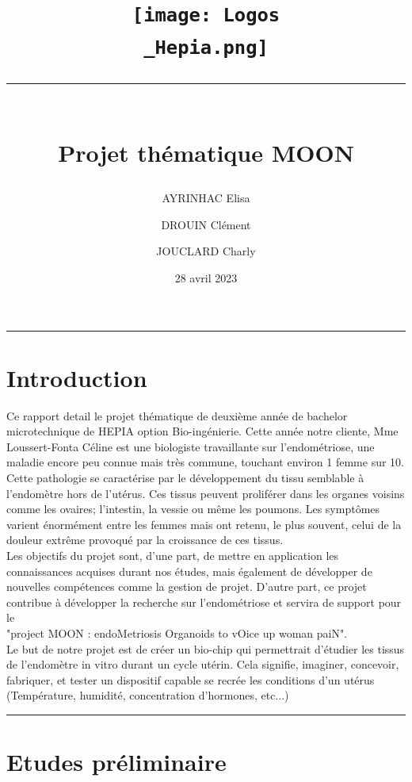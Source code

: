 \documentclass[a4paper, 11pt]{article}
\title{
    \vspace{-2.5cm}
    \centering\texttt{[image: Logos\\\_Hepia.png]}\\
    \centering\rule{17cm}{0.1mm}\vspace*{0.4in}\\
    \centering Projet thématique MOON}
\author[1]{AYRINHAC Elisa}
\author[2]{DROUIN Clément}
\author[3]{JOUCLARD Charly}
\affil[1]{HEPIA, MT2, elisa.ayrinhac@hes-so.ch}
\affil[2]{HEPIA, MT2, clement.drouin@hes-so.ch}
\affil[3]{HEPIA, MT2, charly.jouclard@hes-so.ch}
\date{28 avril 2023}
\begin{document}
\maketitle
\thispagestyle{empty}
\begin{center}
    \rule{\textwidth}{0.1mm}
\end{center}
\vspace{-1cm}
\section*{Introduction}
Ce rapport detail le projet thématique de deuxième année de bachelor
microtechnique de HEPIA option Bio-ingénierie.
Cette année notre cliente, Mme Loussert-Fonta Céline est une biologiste travaillante 
sur l'endométriose, une maladie encore 
peu connue mais très commune, touchant environ 1 femme sur 10.\\
Cette pathologie se caractérise par le développement du tissu semblable 
à l'endomètre hors de l'utérus.
Ces tissus peuvent proliférer dans les organes voisins comme les ovaires; 
l'intestin, la vessie ou même les poumons.
Les symptômes varient énormément entre les femmes mais ont retenu, le 
plus souvent, celui de la douleur 
extrême provoqué par la croissance de ces tissus.\\
Les objectifs du projet sont, d'une part, de mettre en application les 
connaissances acquises durant nos études, mais également de développer de 
nouvelles compétences comme la gestion de projet.
D'autre part, ce projet contribue à développer la recherche sur 
l'endométriose et servira de support pour le \\
"project MOON : endoMetriosis Organoids to vOice up woman paiN".\\
Le but de notre projet est de créer un bio-chip qui permettrait d'étudier 
les tissus de l'endomètre in vitro durant un cycle utérin. Cela signifie, imaginer, concevoir, fabriquer, 
et tester un dispositif capable se recrée 
les conditions d'un utérus (Température, humidité, concentration d'hormones, etc...)
\vspace{1cm}
\maketitle
\thispagestyle{empty}
\begin{center}
    \rule{\textwidth}{0.1mm}
\end{center}
\newpage
\tableofcontents
\newpage
\section{Etudes préliminaire}
\end{document}
